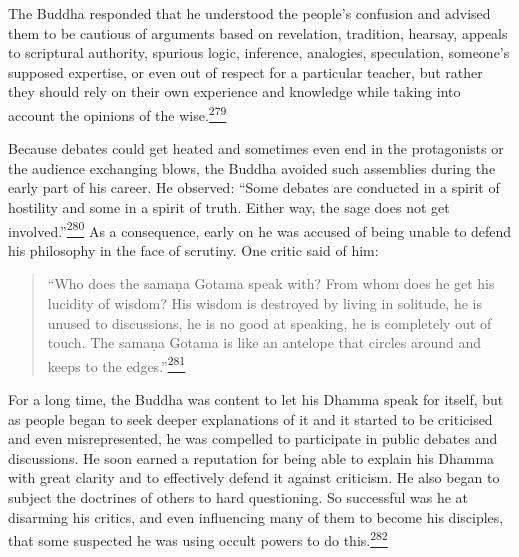 The Buddha responded that he understood the people's confusion and
advised them to be cautious of arguments based on revelation, tradition,
hearsay, appeals to scriptural authority, spurious logic, inference,
analogies, speculation, someone's supposed expertise, or even out of
respect for a particular teacher, but rather they should rely on their
own experience and knowledge while taking into account the opinions of
the
wise.\label{footprints_split_010.html_fnref279}\hyperref[footprints_split_024.htmlux5cux23fn279]{\textsuperscript{279}}

Because debates could get heated and sometimes even end in the
protagonists or the audience exchanging blows, the Buddha avoided such
assemblies during the early part of his career. He observed: ``Some
debates are conducted in a spirit of hostility and some in a spirit of
truth. Either way, the sage does not get
involved.''\label{footprints_split_010.html_fnref280}\hyperref[footprints_split_024.htmlux5cux23fn280]{\textsuperscript{280}}
As a consequence, early on he was accused of being unable to defend his
philosophy in the face of scrutiny. One critic said of him:

\begin{quote}
``Who does the samaṇa Gotama speak with? From whom does he get his
lucidity of wisdom? His wisdom is destroyed by living in solitude, he is
unused to discussions, he is no good at speaking, he is completely out
of touch. The samaṇa Gotama is like an antelope that circles around and
keeps to the
edges.''\label{footprints_split_010.html_fnref281}\hyperref[footprints_split_024.htmlux5cux23fn281]{\textsuperscript{281}}
\end{quote}

For a long time, the Buddha was content to let his Dhamma speak for
itself, but as people began to seek deeper explanations of it and it
started to be criticised and even misrepresented, he was compelled to
participate in public debates and discussions. He soon earned a
reputation for being able to explain his Dhamma with great clarity and
to effectively defend it against criticism. He also began to subject the
doctrines of others to hard questioning. So successful was he at
disarming his critics, and even influencing many of them to become his
disciples, that some suspected he was using occult powers to do
this.\label{footprints_split_010.html_fnref282}\hyperref[footprints_split_024.htmlux5cux23fn282]{\textsuperscript{282}}

